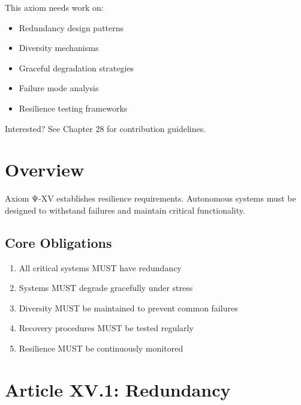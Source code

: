 \begin{tcolorbox}[colback=lightgray, colframe=accentgold, title=\textbf{🎯 Contribution Opportunity}]
This axiom needs work on:
\begin{itemize}
    \item Redundancy design patterns
    \item Diversity mechanisms
    \item Graceful degradation strategies
    \item Failure mode analysis
    \item Resilience testing frameworks
\end{itemize}

Interested? See Chapter 28 for contribution guidelines.
\end{tcolorbox}

\vspace{0.5cm}

\section{Overview}

Axiom Ψ-XV establishes resilience requirements. Autonomous systems must be designed to withstand failures and maintain critical functionality.

\subsection{Core Obligations}

\begin{enumerate}
    \item All critical systems MUST have redundancy
    \item Systems MUST degrade gracefully under stress
    \item Diversity MUST be maintained to prevent common failures
    \item Recovery procedures MUST be tested regularly
    \item Resilience MUST be continuously monitored
\end{enumerate}

\vspace{0.5cm}

\section{Article XV.1: Redundancy}

